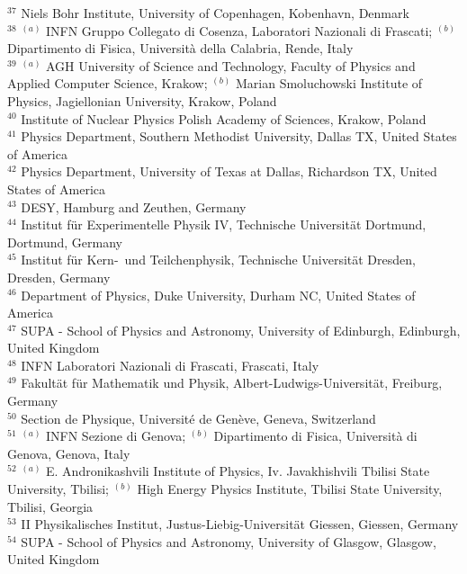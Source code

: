 \begin{flushleft}
$^{37}$ Niels Bohr Institute, University of Copenhagen, Kobenhavn, Denmark\\
$^{38}$ $^{(a)}$ INFN Gruppo Collegato di Cosenza, Laboratori Nazionali di Frascati; $^{(b)}$ Dipartimento di Fisica, Universit{\`a} della Calabria, Rende, Italy\\
$^{39}$ $^{(a)}$ AGH University of Science and Technology, Faculty of Physics and Applied Computer Science, Krakow; $^{(b)}$ Marian Smoluchowski Institute of Physics, Jagiellonian University, Krakow, Poland\\
$^{40}$ Institute of Nuclear Physics Polish Academy of Sciences, Krakow, Poland\\
$^{41}$ Physics Department, Southern Methodist University, Dallas TX, United States of America\\
$^{42}$ Physics Department, University of Texas at Dallas, Richardson TX, United States of America\\
$^{43}$ DESY, Hamburg and Zeuthen, Germany\\
$^{44}$ Institut f{\"u}r Experimentelle Physik IV, Technische Universit{\"a}t Dortmund, Dortmund, Germany\\
$^{45}$ Institut f{\"u}r Kern-{~}und Teilchenphysik, Technische Universit{\"a}t Dresden, Dresden, Germany\\
$^{46}$ Department of Physics, Duke University, Durham NC, United States of America\\
$^{47}$ SUPA - School of Physics and Astronomy, University of Edinburgh, Edinburgh, United Kingdom\\
$^{48}$ INFN Laboratori Nazionali di Frascati, Frascati, Italy\\
$^{49}$ Fakult{\"a}t f{\"u}r Mathematik und Physik, Albert-Ludwigs-Universit{\"a}t, Freiburg, Germany\\
$^{50}$ Section de Physique, Universit{\'e} de Gen{\`e}ve, Geneva, Switzerland\\
$^{51}$ $^{(a)}$ INFN Sezione di Genova; $^{(b)}$ Dipartimento di Fisica, Universit{\`a} di Genova, Genova, Italy\\
$^{52}$ $^{(a)}$ E. Andronikashvili Institute of Physics, Iv. Javakhishvili Tbilisi State University, Tbilisi; $^{(b)}$ High Energy Physics Institute, Tbilisi State University, Tbilisi, Georgia\\
$^{53}$ II Physikalisches Institut, Justus-Liebig-Universit{\"a}t Giessen, Giessen, Germany\\
$^{54}$ SUPA - School of Physics and Astronomy, University of Glasgow, Glasgow, United Kingdom\\

\end{flushleft}
